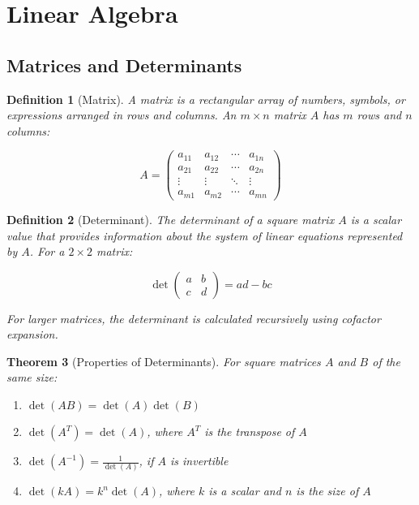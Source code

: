 \documentclass[12pt]{article}
\newif\ifDarkMode
\newcommand{\eqcolor}[1]{\ifDarkMode\textcolor{draculaPurple}{#1}\else#1\fi}
\newcommand{\varcolor}[1]{\ifDarkMode\textcolor{draculaGreen}{#1}\else#1\fi}
\newtheorem{theorem}{Theorem}[section]
\newtheorem{definition}[theorem]{Definition}
\begin{document}
\section{\textcolor{draculaCyan}{Linear Algebra}}

\subsection{\textcolor{draculaYellow}{Matrices and Determinants}}

\begin{definition}[Matrix]
A matrix is a rectangular array of numbers, symbols, or expressions arranged in rows and columns. An $\varcolor{m \times n}$ matrix $\varcolor{A}$ has $\varcolor{m}$ rows and $\varcolor{n}$ columns:

\[
\eqcolor{A = \begin{pmatrix}
a_{11} & a_{12} & \cdots & a_{1n} \\
a_{21} & a_{22} & \cdots & a_{2n} \\
\vdots & \vdots & \ddots & \vdots \\
a_{m1} & a_{m2} & \cdots & a_{mn}
\end{pmatrix}}
\]
\end{definition}

\begin{definition}[Determinant]
The determinant of a square matrix $\varcolor{A}$ is a scalar value that provides information about the system of linear equations represented by $\varcolor{A}$. For a $\varcolor{2 \times 2}$ matrix:

\[
\eqcolor{\det\begin{pmatrix}
a & b \\
c & d
\end{pmatrix} = ad - bc}
\]

For larger matrices, the determinant is calculated recursively using cofactor expansion.
\end{definition}

\begin{theorem}[Properties of Determinants]
For square matrices $\varcolor{A}$ and $\varcolor{B}$ of the same size:
\begin{enumerate}
    \item $\eqcolor{\det(AB) = \det(A)\det(B)}$
    \item $\eqcolor{\det(A^T) = \det(A)}$, where $\varcolor{A^T}$ is the transpose of $\varcolor{A}$
    \item $\eqcolor{\det(A^{-1}) = \frac{1}{\det(A)}}$, if $\varcolor{A}$ is invertible
    \item $\eqcolor{\det(kA) = k^n\det(A)}$, where $\varcolor{k}$ is a scalar and $\varcolor{n}$ is the size of $\varcolor{A}$
\end{enumerate}
\end{theorem}
\end{document}
